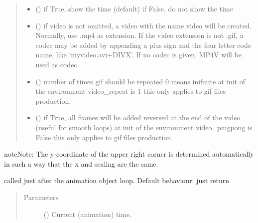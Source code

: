 \documentclass[letterpaper,10pt,english]{sphinxmanual}
\begin{document}
\begin{fulllineitems}
\begin{fulllineitems}
\begin{quote}
\begin{description}
\begin{itemize}
\item {} 
 () \textendash{} if True, show the time (default)  
if False, do not show the time

\item {} 
 () \textendash{} if video is not omitted, a video with the name video
will be created. 
Normally, use .mp4 as extension. 
If the video extension is not .gif, a codec may be added
by appending a plus sign and the four letter code name,
like ‘myvideo.avi+DIVX’. 
If no codec is given, MP4V will be used as codec.

\item {} 
 () \textendash{} number of times gif should be repeated 
0 means inifinite 
at init of the environment video\_repeat is 1 
this only applies to gif files production.

\item {} 
 () \textendash{} if True, all frames will be added reversed at the end of the video (useful for smooth loops)
at init of the environment video\_pingpong is False 
this only applies to gif files production.

\end{itemize}

\end{description}\end{quote}

\begin{sphinxadmonition}{note}{Note:}
The y-coordinate of the upper right corner is determined automatically
in such a way that the x and scaling are the same. 
\end{sphinxadmonition}

\end{fulllineitems}


\begin{fulllineitems}
\label{\detokenize{Reference:salabim.Environment.animation_post_tick}}
called just after the animation object loop. 
Default behaviour: just return
\begin{quote}\begin{description}
\item[{Parameters}] \leavevmode
{} () \textendash{} Current (animation) time.


\end{description}
\end{quote}
\end{fulllineitems}
\end{fulllineitems}
\end{document}
